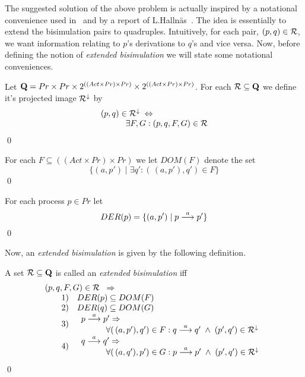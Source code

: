 The suggested solution of the above problem is actually inspired by a notational convenience used in~\cite{Prasad} and by a report of L.\@ Halln\"as~\cite{Hallnas}. The idea is essentially to extend the bisimulation pairs to quadruples. Intuitively, for each pair, $(p,q)\in{\cal R}$, we want information relating to $p$'s derivations to $q$'s and vice versa. Now, before defining the notion of {\em extended bisimulation\/} we will state some notational conveniences.
\begin{notation}
Let $\hbox{\bf Q}=Pr\times Pr\times 2^{((Act\times Pr)\times Pr)}\times 2^{((Act\times Pr)\times Pr)}$. For each ${\cal R}\subseteq \hbox{\bf Q}$ we define it's projected image ${\cal R}^{\downarrow}$ by
\[
\begin{array}{llll}
\multicolumn{4}{l}{(p,q)\in {\cal R}^{\downarrow}\;\Leftrightarrow} \\
&&& \exists F,G: (p,q,F,G)\in {\cal R}
\end{array}
\]
\qed
\end{notation}
\begin{notation}
For each $F\subseteq ((Act\times Pr)\times Pr)$ we let $DOM(F)$ denote the set
\[
\{(a,p')\mid \exists q': (\,(a,p'),q')\in F\}
\]
\qed
\end{notation}
\begin{notation}
For each process $p\in Pr$ let
\[
DER(p) = \{(a,p')\mid p\stackrel{a}{\longrightarrow}p'\}
\]
\qed
\end{notation}
Now, an {\em extended bisimulation\/} is given by the following definition.
\begin{definition}\label{defExtendedBisim}
A set ${\cal R}\subseteq \hbox{\bf Q}$ is called an {\em extended bisimulation\/} iff
\[
\begin{array}{llll}
\multicolumn{4}{l}{(p,q,F,G)\in {\cal R}\;\;\Rightarrow} \\
&&1)& DER(p) \subseteq DOM(F) \\
&&2)& DER(q) \subseteq DOM(G) \\
&&3)& 
\begin{array}{llll}
\multicolumn{4}{l}{p\der{a}p'\Rightarrow}\\
&&&\forall(\,(a,p'),q')\in F: q\der{a}q'\;\wedge\; (p',q')\in {\cal R}^{\downarrow}
\end{array}\\

&&4)& 
\begin{array}{llll}
\multicolumn{4}{l}{q\der{a}q'\Rightarrow}\\
&&&\forall(\,(a,q'),p')\in G: p\der{a}p'\;\wedge\; (p',q')\in {\cal R}^{\downarrow}
\end{array}\\

\end{array}
\]
\qed
\end{definition}
